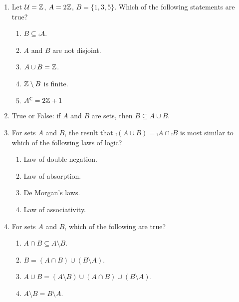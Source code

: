 \pagestyle{empty}


\begin{enumerate}
    \item Let $\mathcal{U} = \mathbb{Z}$, $A = 2\mathbb{Z}$, $B = \{1,3,5\}$. Which of the following statements are true?
    \begin{enumerate}
        \item $B \subseteq \comp{A}$.
        \item $A$ and $B$ are not disjoint.
        \item $A \cup B = \mathbb{Z}$.
        \item $\mathbb{Z} \setminus B$ is finite.
        \item ${A}^{\mathsf{C}} = 2\mathbb{Z} + 1$
    \end{enumerate}
    
    \item True or False: if $A$ and $B$ are sets, then $B \subseteq A \cup B$.
    
    \item For sets $A$ and $B$, the result that $\comp{(A \cup B)} = \comp{A} \cap \comp{B}$ is most similar to which of the following laws of logic?
    \begin{enumerate}
        \item Law of double negation.
        \item Law of absorption.
        \item De Morgan's laws.
        \item Law of associativity.
    \end{enumerate}
    
    \item For sets $A$ and $B$, which of the following are true?
    \begin{enumerate}
        \item $A \cap B \subseteq A \setminus B$.
        \item $B = (A \cap B) \cup (B \setminus A)$.
        \item $A \cup B = (A \setminus B) \cup (A \cap B) \cup (B \setminus A)$.
        \item $A \setminus B = B \setminus A$.
    \end{enumerate}
\end{enumerate}




